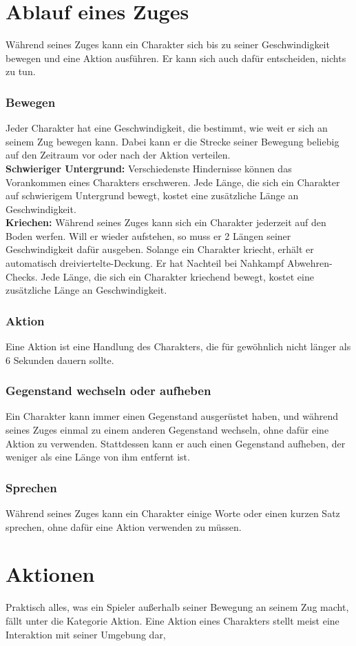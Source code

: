 \section{Ablauf eines Zuges}
Während seines Zuges kann ein Charakter sich bis zu seiner Geschwindigkeit bewegen und eine Aktion ausführen. Er kann sich auch dafür entscheiden, nichts zu tun.
\subsubsection{Bewegen}
Jeder Charakter hat eine Geschwindigkeit, die bestimmt, wie weit er sich an seinem Zug bewegen kann. Dabei kann er die Strecke seiner Bewegung beliebig auf den Zeitraum vor oder nach der Aktion verteilen.\\
\textbf{Schwieriger Untergrund:} Verschiedenste Hindernisse können das Vorankommen eines Charakters erschweren. Jede Länge, die sich ein Charakter auf schwierigem Untergrund bewegt, kostet eine zusätzliche Länge an Geschwindigkeit.\\
\textbf{Kriechen:} Während seines Zuges kann sich ein Charakter jederzeit auf den Boden werfen. Will er wieder aufstehen, so muss er 2 Längen seiner Geschwindigkeit dafür ausgeben. Solange ein Charakter kriecht, erhält er automatisch dreiviertelte-Deckung. Er hat Nachteil bei Nahkampf Abwehren-Checks. Jede Länge, die sich ein Charakter kriechend bewegt, kostet eine zusätzliche Länge an Geschwindigkeit.
\subsubsection{Aktion}
Eine Aktion ist eine Handlung des Charakters, die für gewöhnlich nicht länger als 6 Sekunden dauern sollte.
\subsubsection{Gegenstand wechseln oder aufheben}
Ein Charakter kann immer einen Gegenstand ausgerüstet haben, und während seines Zuges einmal zu einem anderen Gegenstand wechseln, ohne dafür eine Aktion zu verwenden. Stattdessen kann er auch einen Gegenstand aufheben, der weniger als eine Länge von ihm entfernt ist.
\subsubsection{Sprechen}
Während seines Zuges kann ein Charakter einige Worte oder einen kurzen Satz sprechen, ohne dafür eine Aktion verwenden zu müssen.

\section{Aktionen}
Praktisch alles, was ein Spieler außerhalb seiner Bewegung an seinem Zug macht, fällt unter die Kategorie Aktion. Eine Aktion eines Charakters stellt meist eine Interaktion mit seiner Umgebung dar,
